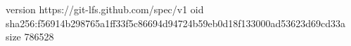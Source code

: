 version https://git-lfs.github.com/spec/v1
oid sha256:f56914b298765a1ff33f5c86694d94724b59eb0d18f133000ad53623d69cd33a
size 786528
